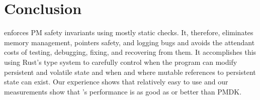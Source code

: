 \section{Conclusion}
\label{sec:conclude}

\This{} enforces PM safety invariants using mostly static checks.  It,
therefore, eliminates memory management, pointers safety, and logging bugs and
avoids the attendant costs of testing, debugging, fixing, and recovering from
them.  It accomplishes this using Rust's type system to carefully control when
the program can modify persistent and volatile state and when and where mutable
references to persistent state can exist.  Our experience shows that \this{}
relatively easy to use and our measurements show that \this{}'s performance is
as good as or better than PMDK.


